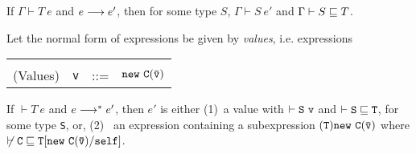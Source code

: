 \begin{theorem} 

If $\Gamma \vdash T\ e$ and $e \derives e'$, then for some type $S$,
$\Gamma \vdash S\ e'$ and $\Gamma \vdash S \subtype T$.

\end{theorem}

Let the normal form of expressions be given by {\em values},
i.e. expressions 

\begin{tabular}{rrcl}
&&&\\
(Values) & {\tt v} &{::=}& $\new\ {\tt C(\bar{\tt v})}$
\end{tabular}


\begin{theorem} 

If $\vdash T\ e$ and $e \starderives e'$, then $e'$ is
either (1)~a value {\tt } with $\vdash {\tt S\ v}$ and $\vdash {\tt S
\subtype T}$, for some type {\tt S}, or, (2)~ an expression containing
a subexpression ${\tt (T)\new\ C(\bar{\tt v})}$ where 
$\not\vdash \tt C\subtype T[\new\ C(\bar{\tt v})/\self]$.

\end{theorem}

